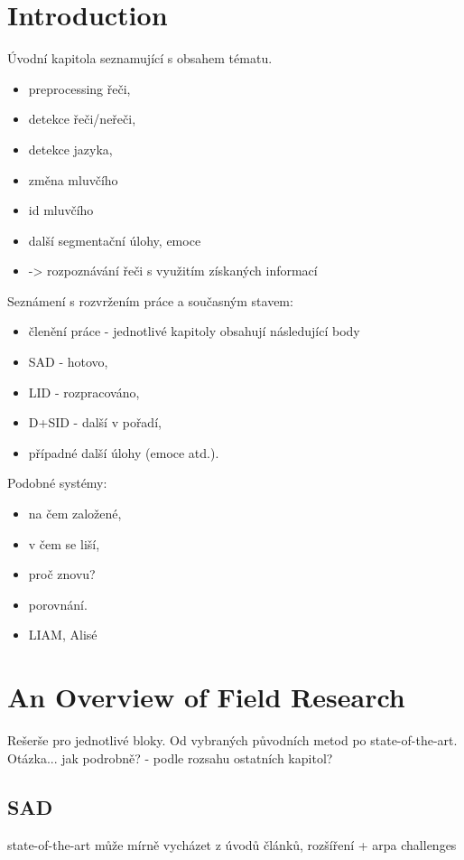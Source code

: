 \documentclass[FM,noheader,EN]{tulthesis}
\begin{document}
\chapter*{Introduction}
Úvodní kapitola seznamující s obsahem tématu.
\begin{itemize}
	\item preprocessing řeči,
	\item detekce řeči/neřeči,
	\item detekce jazyka,
	\item změna mluvčího
	\item id mluvčího
	\item další segmentační úlohy, emoce
	\item -> rozpoznávání řeči s využitím získaných informací
\end{itemize}	

Seznámení s rozvržením práce a současným stavem: 
\begin{itemize}
	\item členění práce - jednotlivé kapitoly obsahují následující body
	\item SAD - hotovo,
	\item LID - rozpracováno,
	\item D+SID - další v pořadí,
	\item případné další úlohy (emoce atd.).
\end{itemize}	

Podobné systémy:
\begin{itemize}
	\item na čem založené,
	\item v čem se liší,
	\item proč znovu?
	\item porovnání.
	\item LIAM, Alisé
\end{itemize}	


\chapter{An Overview of Field Research}
Rešerše pro jednotlivé bloky. 
Od vybraných původních metod po state-of-the-art.
Otázka... jak podrobně? - podle rozsahu ostatních kapitol?

\section{SAD}
state-of-the-art může mírně vycházet z úvodů článků, rozšíření
+ arpa challenges
\end{document}
